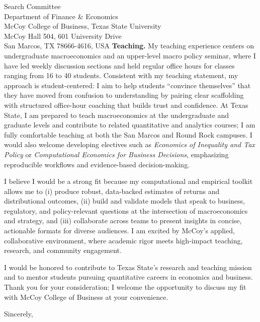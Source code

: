 \documentclass[11pt,letterpaper]{letter}
\begin{document}
\begin{letter}{Search Committee \\
Department of Finance \& Economics \\
McCoy College of Business, Texas State University \\
McCoy Hall 504, 601 University Drive \\
San Marcos, TX 78666-4616, USA}
\textbf{Teaching.} My teaching experience centers on undergraduate macroeconomics and an upper-level macro policy seminar, where I have led weekly discussion sections and held regular office hours for classes ranging from 16 to 40 students. Consistent with my teaching statement, my approach is student-centered: I aim to help students ``convince themselves'' that they have moved from confusion to understanding by pairing clear scaffolding with structured office-hour coaching that builds trust and confidence. At Texas State, I am prepared to teach macroeconomics at the undergraduate and graduate levels and contribute to related quantitative and analytics courses; I am fully comfortable teaching at both the San Marcos and Round Rock campuses. I would also welcome developing electives such as \textit{Economics of Inequality and Tax Policy} or \textit{Computational Economics for Business Decisions}, emphasizing reproducible workflows and evidence-based decision-making.

I believe I would be a strong fit because my computational and empirical toolkit allows me to (i) produce robust, data-backed estimates of returns and distributional outcomes, (ii) build and validate models that speak to business, regulatory, and policy-relevant questions at the intersection of macroeconomics and strategy, and (iii) collaborate across teams to present insights in concise, actionable formats for diverse audiences. I am excited by McCoy’s applied, collaborative environment, where academic rigor meets high-impact teaching, research, and community engagement.

I would be honored to contribute to Texas State’s research and teaching mission and to mentor students pursuing quantitative careers in economics and business. Thank you for your consideration; I welcome the opportunity to discuss my fit with McCoy College of Business at your convenience.

\closing{Sincerely,}

\end{letter}
\end{document}
